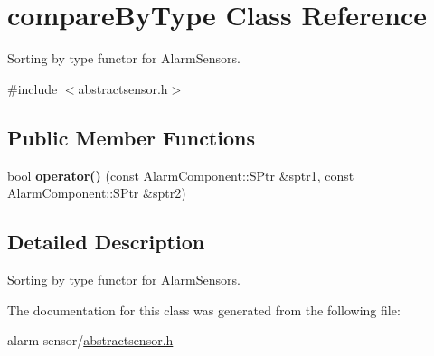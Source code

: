 \hypertarget{classcompareByType}{}\section{compare\+By\+Type Class Reference}
\label{classcompareByType}


Sorting by type functor for Alarm\+Sensors.  




{\ttfamily \#include $<$abstractsensor.\+h$>$}

\subsection*{Public Member Functions}
\begin{DoxyCompactItemize}
\item 
bool {\bfseries operator()} (const Alarm\+Component\+::\+S\+Ptr \&sptr1, const Alarm\+Component\+::\+S\+Ptr \&sptr2)\hypertarget{classcompareByType_a8894c7df4c6735d26043a5720b0a5a26}{}\label{classcompareByType_a8894c7df4c6735d26043a5720b0a5a26}

\end{DoxyCompactItemize}


\subsection{Detailed Description}
Sorting by type functor for Alarm\+Sensors. 

The documentation for this class was generated from the following file\+:\begin{DoxyCompactItemize}
\item 
alarm-\/sensor/\hyperlink{abstractsensor_8h}{abstractsensor.\+h}\end{DoxyCompactItemize}
